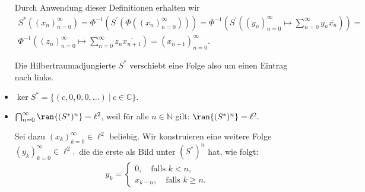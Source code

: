 \begin{solution}
\begin{itemize}
       Durch Anwendung dieser Definitionen erhalten wir
       \begin{align}
           S^*((x_n)_{n=0}^\infty) = \Phi^{-1}(S^\prime(\Phi((x_n)_{n=0}^\infty))) =
           \Phi^{-1}\left(S^\prime\left( (y_n)_{n=0}^\infty \mapsto \sum_{n=0}^\infty y_n \overline{x_n}\right)\right) = \\
           \Phi^{-1}\left((z_n)_{n=0}^\infty \mapsto \sum_{n=0}^\infty z_n \overline{x_{n+1}}\right) = (x_{n+1})_{n=0}^\infty.
       \end{align}

       Die Hilbertraumadjungierte $S^*$ verschiebt eine Folge also um einen Eintrag nach links.

      \item $\ker{S^*} = \{(c, 0, 0, 0, ...)~|~c \in \mathbb{C}\}.$
      \item $\bigcap_{n=0}^\infty \ran{(S^*)^n} = \ell^2$, weil für alle $n \in \mathbb{N}$ gilt: $\ran{(S^*)^n} = \ell^2.$

      Sei dazu $(x_k)_{k=0}^\infty \in \ell^2$ beliebig. Wir konstruieren eine weitere Folge $(y_k)_{k=0}^\infty \in \ell^2,$ die die erste als Bild unter $(S^*)^n$ hat, wie folgt:
      \begin{align}
       y_k = \left\{\begin{array}{ll}
       0, \text{~~~falls~} k < n, \\
       x_{k-n}, \text{~~~falls~} k \geq n.
       \end{array}
      \end{align}
  \end{itemize}
\end{solution}
